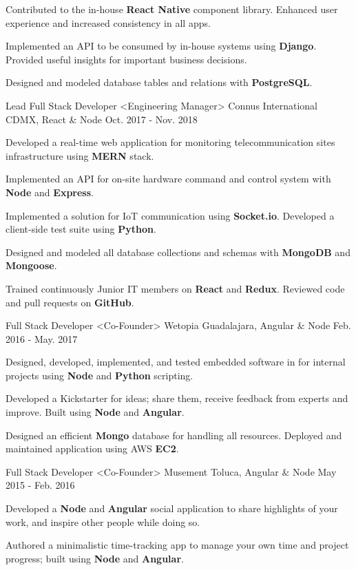 \begin{cventries}
{\begin{cvitems}
        \item {Contributed to the in-house \textbf{React Native} component library. Enhanced user experience and increased consistency in all apps.}
        \item {Implemented an API to be consumed by  in-house systems using \textbf{Django}. Provided useful insights for important business decisions.}
        \item {Designed and modeled database tables and relations with \textbf{PostgreSQL}.}
      \end{cvitems}
    }
  \cventry
    {Lead Full Stack Developer <Engineering Manager>}
    {Connus International}
    {CDMX, React \& Node}
    {Oct. 2017 - Nov. 2018}
    {
      \begin{cvitems}
        \item {Developed a real-time web application for monitoring telecommunication sites infrastructure using \textbf{MERN} stack.}
        \item {Implemented an API for on-site hardware command and control system with \textbf{Node} and \textbf{Express}.}
        \item {Implemented a solution for IoT communication using \textbf{Socket.io}. Developed a client-side test suite using \textbf{Python}.}
        \item {Designed and modeled all database collections and schemas with \textbf{MongoDB} and \textbf{Mongoose}.}
        \item {Trained continuously Junior IT members on \textbf{React} and \textbf{Redux}. Reviewed code and pull requests on \textbf{GitHub}.}
      \end{cvitems}
    }
    \cventry
      {Full Stack Developer <Co-Founder>}
      {Wetopia}
      {Guadalajara, Angular \& Node}
      {Feb. 2016 - May. 2017}
      {
        \begin{cvitems}
          \item{Designed, developed, implemented, and tested embedded software in for internal projects using \textbf{Node} and \textbf{Python} scripting.}
          \item {Developed a Kickstarter for ideas; share them, receive feedback from experts and improve. Built using \textbf{Node} and \textbf{Angular}.}
          \item {Designed an efficient \textbf{Mongo} database for handling all resources. Deployed and maintained application using AWS \textbf{EC2}.}
        \end{cvitems}
      }
      \cventry
        {Full Stack Developer <Co-Founder>}
        {Musement}
        {Toluca, Angular \& Node}
        {May 2015 - Feb. 2016}
        {
          \begin{cvitems}
            \item {Developed a \textbf{Node} and \textbf{Angular} social application to share highlights of your work, and inspire other people while doing so.}
            \item {Authored a minimalistic time-tracking app to manage your own time and project progress; built using \textbf{Node} and \textbf{Angular}.}
          \end{cvitems}
        }
  \end{cventries}
